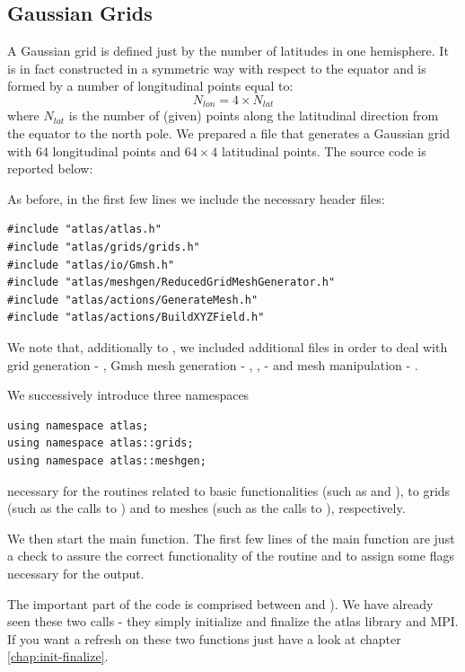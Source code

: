 \subsection{Gaussian Grids}
A Gaussian grid is defined just by the number of latitudes in one 
hemisphere. It is in fact constructed in a symmetric way with respect 
to the equator and is formed by a number of longitudinal points equal 
to:
%
\begin{equation}
N_{lon} = 4 \times N_{lat}
\end{equation}
%
where $N_{lat}$ is the number of (given) points along the latitudinal 
direction from the equator to the north pole. We prepared a file that 
generates a Gaussian grid with 64 longitudinal points and $64\times 4$ 
latitudinal points. The source code is reported below:
%

%
As before, in the first few lines we include the necessary \Atlas 
header files:
%
\begin{lstlisting}[style=CStyleNoLine]
#include "atlas/atlas.h"
#include "atlas/grids/grids.h"
#include "atlas/io/Gmsh.h"
#include "atlas/meshgen/ReducedGridMeshGenerator.h"
#include "atlas/actions/GenerateMesh.h"
#include "atlas/actions/BuildXYZField.h"
\end{lstlisting}
%
We note that, additionally to , we included additional 
files in order to deal with grid generation - , Gmsh 
mesh generation - , , 
 - and mesh manipulation - .

We successively introduce three namespaces
%
\begin{lstlisting}[style=CStyleNoLine]
using namespace atlas;
using namespace atlas::grids;
using namespace atlas::meshgen;
\end{lstlisting}
%
necessary for the routines related to \Atlas basic 
functionalities (such as  and ), 
to grids (such as the calls to ) and to meshes (such as the 
calls to ), respectively.
 
We then start the main function. The first few lines of the main function 
are just a check to assure the correct functionality of the routine and 
to assign some flags necessary for the output. 

The important part of the code is comprised between  
and ). We have already seen these two calls - they 
simply initialize and finalize the atlas library and MPI. If you want a 
refresh on these two functions just have a look at chapter \ref{chap:init-finalize}.

